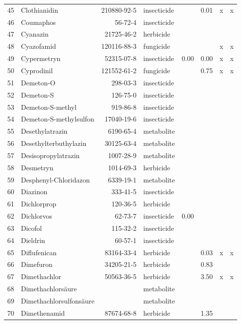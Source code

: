 \begin{longtable}{lp{4cm}rlp{1cm}p{1.5cm}p{1.5cm}p{1cm}}
  45 & Clothianidin & 210880-92-5 & insecticide &  & 0.01 & x & x \\ 
  46 & Coumaphos & 56-72-4 & insecticide &  &  &  &  \\ 
  47 & Cyanazin & 21725-46-2 & herbicide &  &  &  &  \\ 
  48 & Cyazofamid & 120116-88-3 & fungicide &  &  & x & x \\ 
  49 & Cypermetryn & 52315-07-8 & insecticide & 0.00 & 0.00 & x & x \\ 
  50 & Cyprodinil & 121552-61-2 & fungicide &  & 0.75 & x & x \\ 
  51 & Demeton-O & 298-03-3 & insecticide &  &  &  &  \\ 
  52 & Demeton-S & 126-75-0 & insecticide &  &  &  &  \\ 
  53 & Demeton-S-methyl & 919-86-8 & insecticide &  &  &  &  \\ 
  54 & Demeton-S-methylsulfon & 17040-19-6 & insecticide &  &  &  &  \\ 
  55 & Desethylatrazin & 6190-65-4 & metabolite &  &  &  &  \\ 
  56 & Desethylterbuthylazin & 30125-63-4 & metabolite &  &  &  &  \\ 
  57 & Desisopropylatrazin & 1007-28-9 & metabolite &  &  &  &  \\ 
  58 & Desmetryn & 1014-69-3 & herbicide &  &  &  &  \\ 
  59 & Desphenyl-Chloridazon & 6339-19-1 & metabolite &  &  &  &  \\ 
  60 & Diazinon & 333-41-5 & insecticide &  &  &  &  \\ 
  61 & Dichlorprop & 120-36-5 & herbicide &  &  &  &  \\ 
  62 & Dichlorvos & 62-73-7 & insecticide & 0.00 &  &  &  \\ 
  63 & Dicofol & 115-32-2 & insecticide &  &  &  &  \\ 
  64 & Dieldrin & 60-57-1 & insecticide &  &  &  &  \\ 
  65 & Diflufenican & 83164-33-4 & herbicide &  & 0.03 & x & x \\ 
  66 & Dimefuron & 34205-21-5 & herbicide &  & 0.83 &  &  \\ 
  67 & Dimethachlor & 50563-36-5 & herbicide &  & 3.50 & x & x \\ 
  68 & Dimethachlorsäure &  & metabolite &  &  &  &  \\ 
  69 & Dimethachlorsulfonsäure &  & metabolite &  &  &  &  \\ 
  70 & Dimethenamid & 87674-68-8 & herbicide &  & 1.35 &  &  \\ 

\end{longtable}
